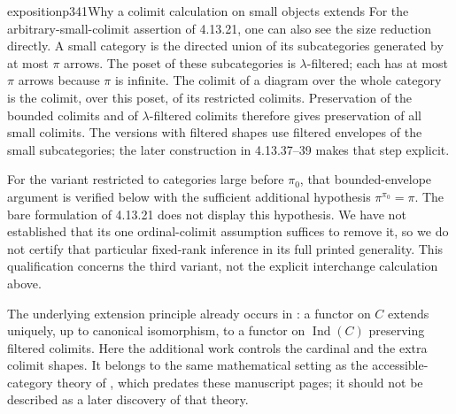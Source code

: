 \begin{dcomment}{exposition}{p341}{Why a colimit calculation on small objects extends}
For the arbitrary-small-colimit assertion of 4.13.21, one can also see the size reduction directly. A small category is the directed union of its subcategories generated by at most $\pi$ arrows. The poset of these subcategories is $\lambda$-filtered; each has at most $\pi$ arrows because $\pi$ is infinite. The colimit of a diagram over the whole category is the colimit, over this poset, of its restricted colimits. Preservation of the bounded colimits and of $\lambda$-filtered colimits therefore gives preservation of all small colimits. The versions with filtered shapes use filtered envelopes of the small subcategories; the later construction in 4.13.37--39 makes that step explicit.

For the variant restricted to categories large before $\pi_0$, that bounded-envelope argument is verified below with the sufficient additional hypothesis $\pi^{\pi_0}=\pi$. The bare formulation of 4.13.21 does not display this hypothesis. We have not established that its one ordinal-colimit assumption suffices to remove it, so we do not certify that particular fixed-rank inference in its full printed generality. This qualification concerns the third variant, not the explicit interchange calculation above.

The underlying extension principle already occurs in \citet[Expos\'e I, 8.7.2--8.7.3]{SGA4I1972}: a functor on $C$ extends uniquely, up to canonical isomorphism, to a functor on $\operatorname{Ind}(C)$ preserving filtered colimits. Here the additional work controls the cardinal and the extra colimit shapes. It belongs to the same mathematical setting as the accessible-category theory of \citet{MakkaiPare1989}, which predates these manuscript pages; it should not be described as a later discovery of that theory.
\end{dcomment}

